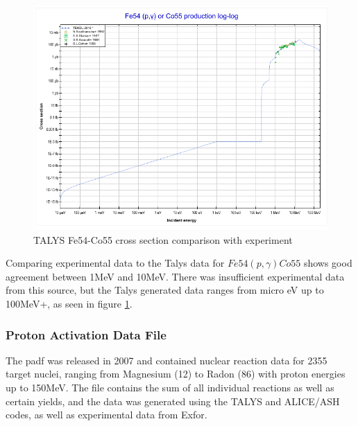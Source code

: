 \begin{figure}[tbp]
  \begin{center}
    \includegraphics[width=.75\linewidth]{chapters/isotope_activation_and_radioactive_decay/images/Fe54-Co55.png}
    \caption{TALYS Fe54-Co55 cross section comparison with experiment \cite{tendlfeco}}
    \label{fig:Fe54-Co55}
  \end{center}
\end{figure}

Comparing experimental data to the Talys data for $Fe54(p, \gamma)Co55$ shows good agreement between 1MeV and 10MeV.  There was insufficient experimental data from this source, but the Talys generated data ranges from micro eV up to 100MeV+, as seen in figure \ref{fig:Fe54-Co55}\cite{tendlfeco}.


\FloatBarrier
\subsubsection{Proton Activation Data File}

The \acrfull{padf} was released in 2007 and contained nuclear reaction data for 2355 target nuclei, ranging from Magnesium (12) to Radon (86) with proton energies up to 150MeV.  The file contains the sum of all individual reactions as well as certain yields, and the data was generated using the TALYS and ALICE/ASH codes, as well as experimental data from Exfor\cite{exforlink}.

